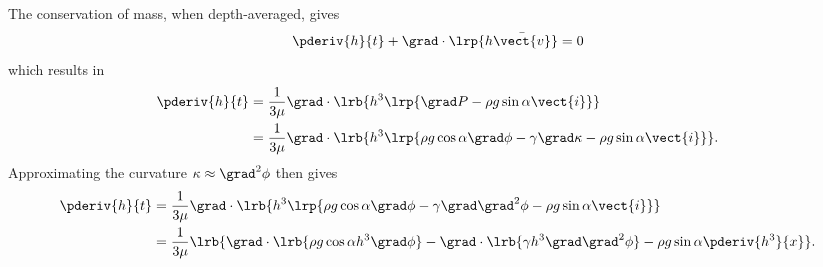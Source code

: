 The conservation of mass, when depth-averaged, gives 
\begin{align}
    \pderiv{h}{t} + \grad \cdot \lrp{h\bar{\vect{v}}} = 0
\end{align}
which results in 
\begin{align}
    \nonumber \pderiv{h}{t} &= \frac{1}{3\mu} \grad \cdot \lrb{h^3 \lrp{\grad P - \rho g \sin \alpha \vect{i}}}\\
    &= \frac{1}{3\mu} \grad \cdot \lrb{h^3 \lrp{\rho g \cos\alpha \grad \phi - \gamma\grad\kappa - \rho g \sin \alpha \vect{i}}}. 
\end{align}
Approximating the curvature $\kappa \approx \grad^2 \phi$ then gives 
\begin{align}
    \nonumber \pderiv{h}{t} &= \frac{1}{3\mu} \grad \cdot \lrb{h^3 \lrp{\rho g \cos\alpha \grad \phi - \gamma\grad\grad^2\phi - \rho g \sin \alpha \vect{i}}}\\
    &= \frac{1}{3\mu} \lrb{ \grad \cdot \lrb{\rho g \cos \alpha h^3 \grad \phi} - \grad \cdot \lrb{\gamma h^3 \grad\grad^2\phi} - \rho g \sin\alpha \pderiv{h^3}{x} }.
    \label{eq:thin_film_dim}
\end{align}

